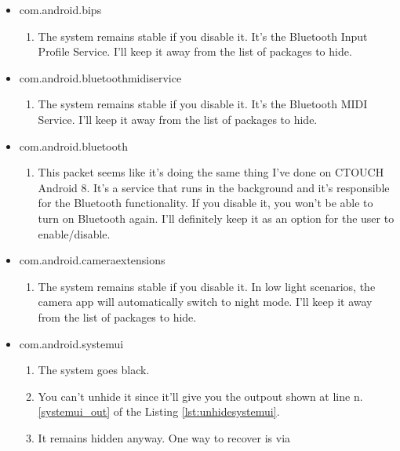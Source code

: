 \begin{itemize}
\begin{enumerate}
        \end{enumerate}
    \item com.android.bips
        \begin{enumerate}
            \item The system remains stable if you disable it. It's the Bluetooth Input Profile Service. I'll keep it away from the list of packages to hide.
        \end{enumerate}
    \item com.android.bluetoothmidiservice
        \begin{enumerate}
            \item The system remains stable if you disable it. It's the Bluetooth MIDI Service. I'll keep it away from the list of packages to hide.
        \end{enumerate}
    \item com.android.bluetooth
        \begin{enumerate}
            \item This packet seems like it's doing the same thing I've done on CTOUCH Android 8. It's a service that runs in the background and it's responsible for the Bluetooth functionality. If you disable it, you won't be able to turn on Bluetooth again. I'll definitely keep it as an option for the user to enable/disable.
        \end{enumerate}
    \item com.android.cameraextensions
        \begin{enumerate}
            \item The system remains stable if you disable it. In low light scenarios, the camera app will automatically switch to night mode. I'll keep it away from the list of packages to hide.
        \end{enumerate}
    \item com.android.systemui
        \begin{enumerate}
            \item The system goes black.
            \item You can't unhide it since it'll give you the outpout shown at line n. \ref{systemui_out} of the Listing \ref{lst:unhidesystemui}.
            \item It remains hidden anyway. One way to recover is via 
        \end{enumerate}
\end{itemize}

